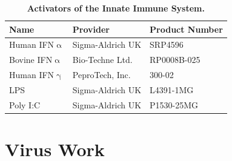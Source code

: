 \begin{table}
\centering
\begin{tabular}{lll}
\toprule
\textbf{Name} & \textbf{Provider}    & \textbf{Product Number} \\ \midrule
Human IFN$\upalpha$    & Sigma-Aldrich UK     & SRP4596                 \\ 
Bovine IFN$\upalpha$   & Bio-Techne Ltd.      & RP0008B-025             \\ 
Human IFN$\upgamma$    & PeproTech, Inc.      & 300-02                  \\ 
LPS           & Sigma-Aldrich UK     & L4391-1MG               \\ 
Poly I:C      & Sigma-Aldrich UK     & P1530-25MG              \\ \bottomrule
\end{tabular}
\caption[Activators of the Innate Immune System.]{\textbf{Activators of the Innate Immune System.}}
\label{tab:Activators of the Innate Immune System Table}
\end{table}

\section{Virus Work} \label{sec:Virus Work}
